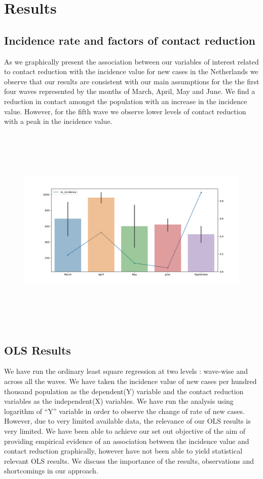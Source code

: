\documentclass[11pt, a4paper, leqno]{article}
\begin{document}
\newpage
\section{Results}
\subsection{Incidence rate and factors of contact reduction}

As we graphically present the association between our variables of interest related to contact reduction with the incidence value for new cases in the Netherlands we observe that our results are consistent with our  main assumptions for the the first four waves represented by the months of March, April, May and June. We find a reduction in contact amongst the population with an increase in the incidence value. However, for the fifth wave we observe lower levels of contact reduction with a peak in the incidence value. 

\begin{figure}[htp]
    \centering
    \includegraphics[width=12cm, height=10cm]{../../bld/figures/incidence_contact_reduction}
    \caption{}
    \label{fig:galaxy}
\end{figure}


\pagebreak
\subsection{OLS Results}
We have run the ordinary least square regression at two levels : wave-wise and across all the waves. We have taken the incidence value of new cases per hundred thousand population as the dependent(Y) variable and the contact reduction variables as the independent(X) variables. We have run the analysis using  logarithm of ``Y'' variable in order to observe the change of rate of new cases. However, due to very limited available data, the relevance of our OLS results is very limited. We have been able to achieve our set out objective of the aim of providing empirical evidence of an association between the incidence value and contact reduction graphically, however have not been able to yield statistical relevant OLS results. We discuss the importance of the results, observations and shortcomings in our approach.
\end{document}
